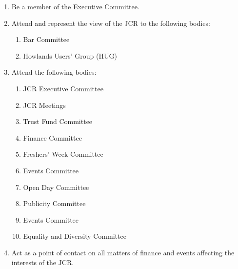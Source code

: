 \begin{enumerate}
    \item Be a member of the Executive Committee.
    \item Attend and represent the view of the JCR to the following bodies:
    \begin{enumerate}
        \item Bar Committee
        \item Howlands Users' Group (HUG)
    \end{enumerate}
    \item Attend the following bodies:
    \begin{enumerate}
        \item JCR Executive Committee
        \item JCR Meetings
        \item Trust Fund Committee
        \item Finance Committee
        \item Freshers’ Week Committee
        \item Events Committee
        \item Open Day Committee
        \item Publicity Committee
        \item Events Committee
        \item Equality and Diversity Committee
    \end{enumerate}
    \item Act as a point of contact on all matters of finance and events affecting the interests of the JCR.


\end{enumerate}
